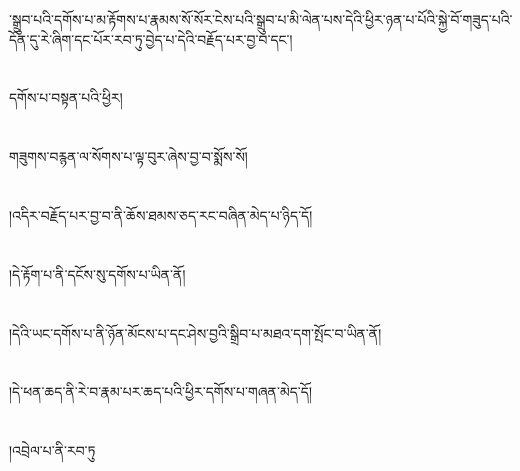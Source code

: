 ་སྒྲུབ་པའི་དགོས་པ་མ་རྟོགས་པ་རྣམས་སོ་སོར་ངེས་པའི་སྒྲུབ་པ་མི་ལེན་པས་དེའི་ཕྱིར་ཉན་པ་པོའི་སྐྱེ་བོ་གཟུད་པའི་དོན་དུ་རེ་ཞིག་དང་པོར་རབ་ཏུ་བྱེད་པ་དེའི་བརྗོད་པར་བྱ་བ་དང་།\chapter{ }དགོས་པ་བསྟན་པའི་ཕྱིར།\chapter{ }གཟུགས་བརྙན་ལ་སོགས་པ་ལྟ་བུར་ཞེས་བྱ་བ་སྨོས་སོ།\chapter{ }།འདིར་བརྗོད་པར་བྱ་བ་ནི་ཆོས་ཐམས་ཅད་རང་བཞིན་མེད་པ་ཉིད་དོ།\chapter{ }།དེ་རྟོག་པ་ནི་དངོས་སུ་དགོས་པ་ཡིན་ནོ།\chapter{ }།དེའི་ཡང་དགོས་པ་ནི་ཉོན་མོངས་པ་དང་ཤེས་བྱའི་སྒྲིབ་པ་མཐའ་དག་སྤོང་བ་ཡིན་ནོ།\chapter{ }།དེ་ཕན་ཆད་ནི་རེ་བ་རྣམ་པར་ཆད་པའི་ཕྱིར་དགོས་པ་གཞན་མེད་དོ།\chapter{ }།འབྲེལ་པ་ནི་རབ་ཏུ